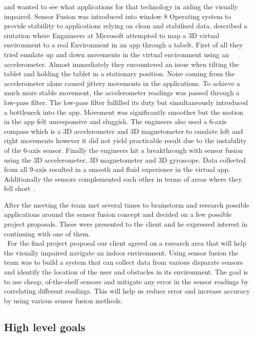 \documentclass[prodmode,acmtosem]{acmsmall} %
\begin{document}
and wanted to see what applications for that technology in aiding the visually impaired. Sensor Fusion was introduced into window 8 Operating system to provide stabiility to applications relying on clean and stabilised data. \citet{SinofskySteven} described a siutation where Engnineers at Microsoft attempted to map a 3D virtual environment to a real Environment in an app through a tabelt. First of all they tried emulate up and down movements in the virtual environment using an accelerometer. Almost immediately they encountered an issue when tilting the tablet and holding the tablet in a stationary position. Noise coming from the accelerometer alone caused jittery movements in the applications. To achieve a much more stable movement, the accelerometer readings was passed through a low-pass filter. The low-pass filter fulfilled its duty but simultaneously introduced a bottleneck into the app. Movement was significantly smoother but the motion in the app felt unresponsive and sluggish. The engineers also used a 6-axis compass which is a 3D accelerometer and 3D magnetometer to emulate left and right movements however it did not yield practicable result due to the instability of the 6-axis sensor. Finally the engineers hit a breakthrough with sensor fusion using the 3D accelerometer, 3D magnetometer and 3D gyroscope. Data collected from all 9-axis resulted in a smooth and fluid experience in the virtual app. Additionally the sensors complemented each other in terms of areas where they fell short~\cite{SinofskySteven}.

After the meeting the team met several times to brainstorm and research possible applications around the sensor fusion concept and decided on a few possible project proposals.
These were presented to the client and he expressed interest in continuing with one of them.\\\
For the final project proposal our client agreed on a research area that will help the visually impaired navigate an indoor environment.
Using sensor fusion the team was to build a system that can collect data from various disparate sensors and identify the location of the user and obstacles in its environment.
The goal is to use cheap, of-the-shelf sensors and mitigate any error in the sensor readings by correlating different readings. This will help us reduce error and increase accuracy by using various sensor fusion methods.
\subsection{High level goals}
\end{document}
